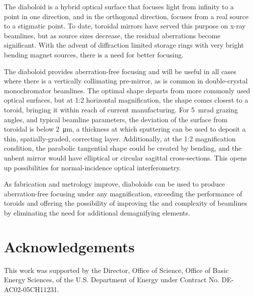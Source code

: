 \documentclass{iucr}       %
\begin{document}
The diaboloid is a hybrid optical surface that focuses light from infinity to a point in one direction, and in the orthogonal direction, focuses from a real source to a stigmatic point. To date, toroidal mirrors have served this purpose on x-ray beamlines, but as source sizes decrease, the residual aberrations become significant. With the advent of diffraction limited storage rings with very bright bending magnet sources, there is a need for better focusing. 

The diaboloid provides aberration-free focusing and will be useful in all cases where there is a vertically collimating pre-mirror, as is common in double-crystal monochromator beamlines. The optimal shape departs from more commonly used optical surfaces, but at 1:2 horizontal magnification, the shape comes closest to a toroid, bringing it within reach of current manufacturing.
For \SI{5}{\milli\radian} grazing angles, and typical beamline parameters, the deviation of the surface from toroidal is below \SI{2}{\micro\meter}, a thickness at which sputtering can be used to deposit a thin, spatially-graded, correcting layer. Additionally, at the 1:2 magnification condition, the parabolic tangential shape could be created by bending, and the unbent mirror would have elliptical or circular sagittal cross-sections. This opens up possibilities for normal-incidence optical interferometry.

As fabrication and metrology improve, diaboloids can be used to produce aberration-free focusing under any magnification, exceeding the performance of toroids and offering the possibility of improving the  and complexity of beamlines by eliminating the need for additional demagnifying elements. 




\vspace{5mm}
\section{Acknowledgements}    
 
 
This work was supported by the Director, Office of Science, Office of Basic Energy Sciences, of the U.S. Department of Energy under Contract No. DE-AC02-05CH11231.
\end{document}
